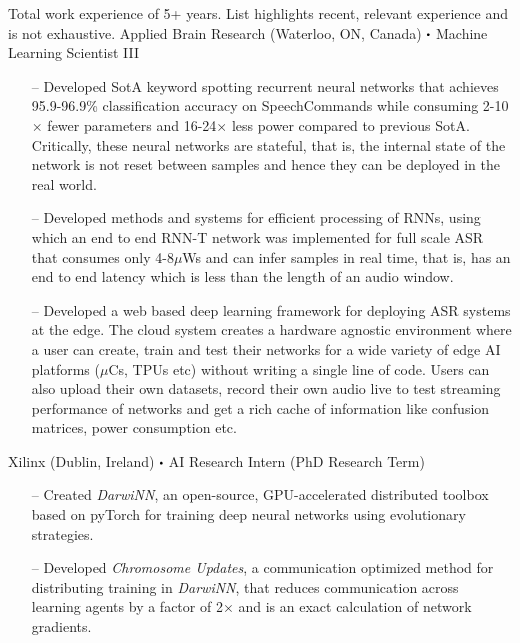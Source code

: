 Total work experience of 5+ years. List highlights recent, relevant experience and is not exhaustive.
    {
    	Applied Brain Research (Waterloo, ON, Canada)}
    {
    	$\sbullet$ Machine Learning Scientist III
    }
    {
        \justify
        \begin{itemize}
            \item [--] Developed SotA keyword spotting recurrent neural networks that achieves 95.9-96.9\% classification accuracy on SpeechCommands while consuming 2-10$\times$ fewer parameters and 16-24$\times$ less power compared to previous SotA. Critically, these neural networks are stateful, that is, the internal state of the network is not reset between samples and hence they can be deployed in the real world.
           \item  [--] Developed methods and systems for efficient processing of RNNs, using which an end to end RNN-T network was implemented for full scale ASR that consumes only 4-8$\mu$Ws and can infer samples in real time, that is, has an end to end latency which is less than the length of an audio window.
           \item [--] Developed a web based deep learning framework for deploying ASR systems at the edge. The cloud system creates a hardware agnostic environment where a user can create, train and test their networks for a wide variety of edge AI platforms ($\mu$Cs, TPUs etc) without writing a single line of code. Users can also upload their own datasets, record their own audio live to test streaming performance of networks and get a rich cache of information like confusion matrices, power consumption etc.
	   \end{itemize}
	}
    
    {
	    Xilinx (Dublin, Ireland)}
    {
	    $\sbullet$ AI Research Intern (PhD Research Term)
    }
    {
	    \justify
        \begin{itemize}
            \item [--]  Created \textit{DarwiNN}, an open-source, GPU-accelerated distributed toolbox based on pyTorch for training deep neural networks using evolutionary strategies.
            \item [--]  Developed \textit{Chromosome Updates}, a communication optimized method for distributing training in \textit{DarwiNN}, that reduces communication across learning agents by a factor of 2$\times$ and is an exact calculation of network gradients.
	   \end{itemize}
    }
    

